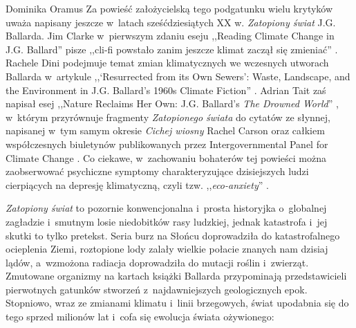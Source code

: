\begin{artplenv}{Dominika Oramus}
Za powieść założycielską tego podgatunku wielu krytyków uważa napisany jeszcze w~latach sześćdziesiątych XX w. \textit{Zatopiony świat} J.G. Ballarda. Jim Clarke w~pierwszym zdaniu eseju ,,Reading Climate Change in J.G. Ballard'' pisze ,,cli-fi powstało zanim jeszcze klimat zaczął się zmieniać''
\parencite[][tłum. D.O.]{clarke_reading_2013}. %
 Rachele Dini podejmuje temat zmian klimatycznych we wczesnych utworach Ballarda w~artykule ,,‘Resurrected from its Own Sewers’: Waste, Landscape, and the Environment in J.G. Ballard's 1960s Climate Fiction'' 
\parencite[][]{dini_resurrected_2021}. %
 Adrian Tait zaś napisał esej ,,Nature Reclaims Her Own: J.G. Ballard's \textit{The Drowned World}'' 
\parencite[][]{mcgrath_nature_2016}, %
 w~którym przyrównuje fragmenty \textit{Zatopionego świata} do cytatów ze słynnej, napisanej w~tym samym okresie \textit{Cichej wiosny} Rachel Carson oraz całkiem współczesnych biuletynów publikowanych przez Intergovernmental Panel for Climate Change 
\parencite[][s.~158]{mcgrath_nature_2016}. %
 Co ciekawe, w~zachowaniu bohaterów tej powieści można zaobserwować psychiczne symptomy charakteryzujące dzisiejszych ludzi cierpiących na depresję klimatyczną, czyli tzw. ,,\textit{eco-anxiety}'' 
\parencite[][]{gifford_largely_2016}.%


\textit{Zatopiony świat} to pozornie konwencjonalna i~prosta historyjka o~globalnej zagładzie i~smutnym losie niedobitków rasy ludzkiej, jednak katastrofa i~jej skutki to tylko pretekst. Seria burz na Słońcu doprowadziła do katastrofalnego ocieplenia Ziemi, roztopione lody zalały wielkie połacie znanych nam dzisiaj lądów, a~wzmożona radiacja doprowadziła do mutacji roślin i~zwierząt. Zmutowane organizmy na kartach książki Ballarda przypominają przedstawicieli pierwotnych gatunków stworzeń z~najdawniejszych geologicznych epok. Stopniowo, wraz ze zmianami klimatu i~linii brzegowych, świat upodabnia się do tego sprzed milionów lat i~cofa się ewolucja świata ożywionego:



\end{artplenv}
